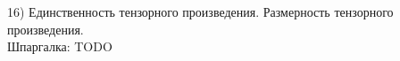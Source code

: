 16) Единственность тензорного произведения. Размерность тензорного произведения.\\
Шпаргалка: TODO\\
